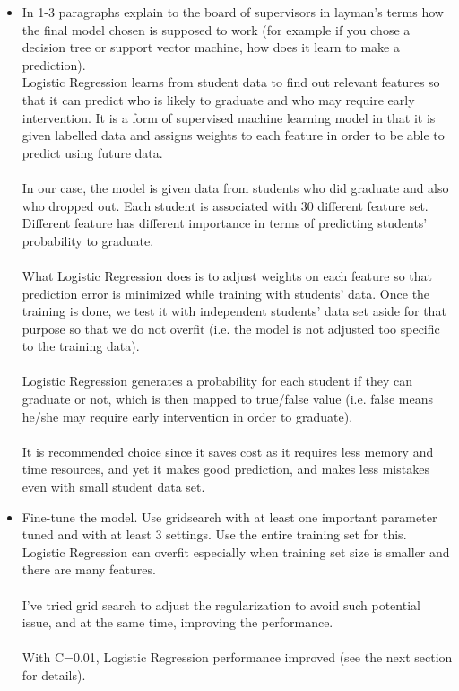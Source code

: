 \documentclass{article}
\begin{document}
\begin{itemize}
\item In 1-3 paragraphs explain to the board of supervisors in layman's terms how the final model chosen is supposed to work (for example if you chose a decision tree or support vector machine, how does it learn to make a prediction).\\
\color{blue}
Logistic Regression learns from student data to find out relevant features so that it can predict who is likely to graduate and who may require early intervention.  It is a form of supervised machine learning model in that it is given labelled data and assigns weights to each feature in order to be able to predict using future data.\\
\\
In our case, the model is given data from students who did graduate and also who dropped out.  Each student is associated with 30 different feature set.  Different feature has different importance in terms of predicting students' probability to graduate. \\
\\
What Logistic Regression does is to adjust weights on each feature so that prediction error is minimized while training with students' data.  Once the training is done, we test it with independent students' data set aside for that purpose so that we do not overfit (i.e. the model is not adjusted too specific to the training data).\\
\\
Logistic Regression generates a probability for each student if they can graduate or not, which is then mapped to true/false value (i.e. false means he/she may require early intervention in order to graduate).\\
\\
It is recommended choice since it saves cost as it requires less memory and time resources, and yet it makes good prediction, and makes less mistakes even with small student data set.
\color{black}

\item Fine-tune the model. Use gridsearch with at least one important parameter tuned and with at least 3 settings. Use the entire training set for this.
\\
\color{blue}
Logistic Regression can overfit especially when training set size is smaller and there are many features.\\
\\
I've tried grid search to adjust the regularization to avoid such potential issue, and at the same time, improving the performance.\\
\\
With C=0.01, Logistic Regression performance improved (see the next section for details). \\


\end{itemize}
\end{document}
